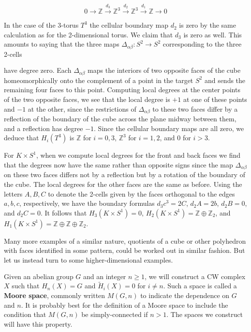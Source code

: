 \[ 0 \to \mathbb{Z} \xrightarrow{d_3} \mathbb{Z}^3 \xrightarrow{d_2} \mathbb{Z}^3 \xrightarrow{d_1} \mathbb{Z} \to 0 \]

In the case of the 3-torus $T^3$ the cellular boundary map $d_2$ is zero by the same calculation as for the 2-dimensional torus. We claim that $d_3$ is zero as well. This amounts to saying that the three maps $\Delta_{\alpha \beta}: S^2 \to S^2$ corresponding to the three 2-cells

have degree zero. Each $\Delta_{\alpha\beta}$ maps the interiors of two opposite faces of the cube homeomorphically onto the complement of a point in the target $S^2$ and sends the remaining four faces to this point. Computing local degrees at the center points of the two opposite faces, we see that the local degree is $+1$ at one of these points and $-1$ at the other, since the restrictions of $\Delta_{\alpha\beta}$ to these two faces differ by a reflection of the boundary of the cube across the plane midway between them, and a reflection has degree $-1$. Since the cellular boundary maps are all zero, we deduce that $H_i(T^3)$ is $\mathbb{Z}$ for $i=0,3$, $\mathbb{Z}^3$ for $i=1,2$, and $0$ for $i > 3$.

For $K \times S^1$, when we compute local degrees for the front and back faces we find that the degrees now have the same rather than opposite signs since the map $\Delta_{\alpha\beta}$ on these two faces differs not by a reflection but by a rotation of the boundary of the cube. The local degrees for the other faces are the same as before. Using the letters $A, B, C$ to denote the 2-cells given by the faces orthogonal to the edges $a, b, c$, respectively, we have the boundary formulas $d_3c^3 = 2C$, $d_2A = 2b$, $d_2B = 0$, and $d_2C = 0$. It follows that $H_3(K \times S^1) = 0$, $H_2(K \times S^1) = \mathbb{Z} \oplus \mathbb{Z}_2$, and $H_1(K \times S^1) = \mathbb{Z} \oplus \mathbb{Z} \oplus \mathbb{Z}_2$.

Many more examples of a similar nature, quotients of a cube or other polyhedron with faces identified in some pattern, could be worked out in similar fashion. But let us instead turn to some higher-dimensional examples.

\begin{example}
\label{ex:moore-spaces}
Given an abelian group $G$ and an integer $n \geq 1$, we will construct a CW complex $X$ such that $H_n(X) = G$ and $\tilde{H}_i(X) = 0$ for $i \neq n$. Such a space is called a \textbf{Moore space}, commonly written $M(G, n)$ to indicate the dependence on $G$ and $n$. It is probably best for the definition of a Moore space to include the condition that $M(G, n)$ be simply-connected if $n > 1$. The spaces we construct will have this property.
\end{example}

